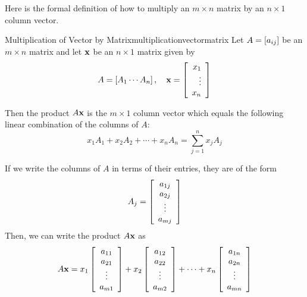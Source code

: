 Here is the formal definition of how to multiply an $m\times
n $ matrix by an $ n\times 1 $ column vector.

\begin{definition}{Multiplication of Vector by Matrix}{multiplicationvectormatrix}
Let $A=\left[ a_{ij} \right]$ be an $m\times n$ matrix and let $\mathbf{x}$
be an $n\times 1$ matrix given by 
\begin{equation*}
A=\left[ A_{1} \cdots A_{n}\right], \quad \mathbf{x} = \left[
\begin{array}{r}
x_{1} \\
\vdots \\
x_{n}
\end{array}
\right] 
\end{equation*}

Then the product $A\mathbf{x}$ is the $m\times 1$ column
vector which equals the following
linear combination of the columns of $A$:
\begin{equation*}
x_{1}A_{1}+x_{2}A_{2}+\cdots +x_{n}A_{n} = 
\sum_{j=1}^{n}x_{j}A_{j}  
\end{equation*}
\end{definition}

If we write the columns of $A$ in terms of their entries, they are of the form
\begin{equation*}
A_{j}  =
\left[
\begin{array}{c}
a_{1j} \\
a_{2j} \\
\vdots \\
a_{mj}
\end{array}
\right] 
\end{equation*}
Then, we can write the product $A\mathbf{x}$ as
\begin{equation*}
A\mathbf{x} = 
x_{1}\left[
\begin{array}{c}
a_{11} \\
a_{21} \\
\vdots \\
a_{m1}
\end{array}
\right] + x_{2}\left[
\begin{array}{c}
a_{12} \\
a_{22} \\
\vdots \\
a_{m2}
\end{array}
\right] +\cdots + x_{n}\left[
\begin{array}{c}
a_{1n} \\
a_{2n} \\
\vdots \\
a_{mn}
\end{array}
\right] 
\end{equation*}

